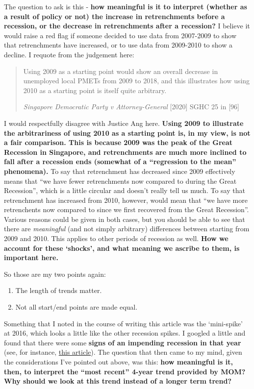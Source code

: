 \documentclass[openany]{book}
\providecommand{\tightlist}{%
  \setlength{\itemsep}{0pt}\setlength{\parskip}{0pt}}
\begin{document}
The question to ask is this - \textbf{how meaningful is it to interpret
(whether as a result of policy or not) the increase in retrenchments
before a recession, or the decrease in retrenchments after a recession?}
I believe it would raise a red flag if someone decided to use data from
2007-2009 to show that retrenchments have increased, or to use data from
2009-2010 to show a decline. I requote from the judgement here:

\begin{quote}
Using 2009 as a starting point would show an overall decrease in
unemployed local PMETs from 2009 to 2018, and this illustrates how using
2010 as a starting point is itself quite arbitrary.

\emph{Singapore Democratic Party v Attorney-General} {[}2020{]} SGHC 25
in {[}96{]}
\end{quote}

I would respectfully disagree with Justice Ang here. \textbf{Using 2009
to illustrate the arbitrariness of using 2010 as a starting point is, in
my view, is not a fair comparison. This is because 2009 was the peak of
the Great Recession in Singapore, and retrenchments are much more
inclined to fall after a recession ends (somewhat of a ``regression to
the mean'' phenomena).} To say that retrenchment has decreased since
2009 effectively means that ``we have fewer retrenchments now compared
to during the Great Recession'', which is a little circular and doesn't
really tell us much. To say that retrenchment has increased from 2010,
however, would mean that ``we have more retrenchents now compared to
since we first recovered from the Great Recession''. Various reasons
could be given in both cases, but you should be able to see that there
are \emph{meaningful} (and not simply arbitrary) differences between
starting from 2009 and 2010. This applies to other periods of recession
as well. \textbf{How we account for these `shocks', and what meaning we
ascribe to them, is important here.}

So those are my two points again:

\begin{enumerate}
\def\labelenumi{\arabic{enumi}.}
\tightlist
\item
  The length of trends matter.
\item
  Not all start/end points are made equal.
\end{enumerate}

Something that I noted in the course of writing this article was the
`mini-spike' at 2016, which looks a little like the other recession
spikes. I googled a little and found that there were some \textbf{signs
of an impending recession in that year} (see, for instance,
\href{https://www.cnbc.com/2016/11/23/is-singapores-economy-headed-for-a-technical-recession.html}{this
article}). The question that then came to my mind, given the
considerations I've pointed out above, was this: \textbf{how meaningful
is it, then, to interpret the ``most recent'' 4-year trend provided by
MOM? Why should we look at this trend instead of a longer term trend?}
\end{document}
